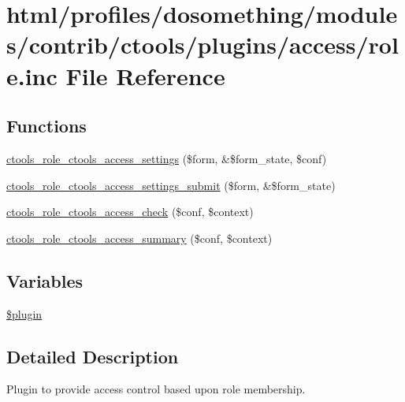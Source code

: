 \hypertarget{role_8inc}{
\section{html/profiles/dosomething/modules/contrib/ctools/plugins/access/role.inc File Reference}
\label{role_8inc}
}
\subsection*{Functions}
\begin{DoxyCompactItemize}
\item 
\hyperlink{role_8inc_af429c6970ffa2b4a73a05034760ff182}{ctools\_\-role\_\-ctools\_\-access\_\-settings} (\$form, \&\$form\_\-state, \$conf)
\item 
\hyperlink{role_8inc_a22b73bb5fff413945fcb78003c83f166}{ctools\_\-role\_\-ctools\_\-access\_\-settings\_\-submit} (\$form, \&\$form\_\-state)
\item 
\hyperlink{role_8inc_a59fc5cbf5bab8ab64e7a14d0eb969e71}{ctools\_\-role\_\-ctools\_\-access\_\-check} (\$conf, \$context)
\item 
\hyperlink{role_8inc_ac61e26b3347f14f8791b5c1e12793a99}{ctools\_\-role\_\-ctools\_\-access\_\-summary} (\$conf, \$context)
\end{DoxyCompactItemize}
\subsection*{Variables}
\begin{DoxyCompactItemize}
\item 
\hyperlink{role_8inc_ada8a7130088351710bb02ed622d6bf65}{\$plugin}
\end{DoxyCompactItemize}


\subsection{Detailed Description}
Plugin to provide access control based upon role membership. 

